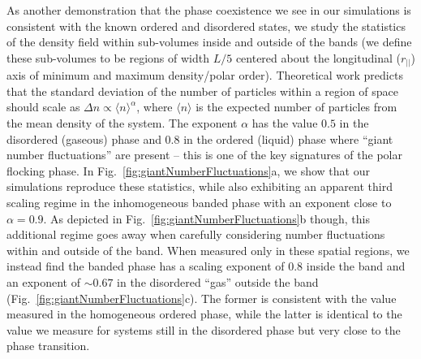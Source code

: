 \documentclass[twoside,twocolumn,9pt]{article}
\begin{document}
As another demonstration that the phase coexistence we see in our simulations is consistent with the known ordered and disordered states, we study the statistics of the density field within sub-volumes inside and outside of the bands (we define these sub-volumes to be regions of width $L/5$ centered about the longitudinal ($r_{||}$) axis of minimum and maximum density/polar order).
Theoretical work predicts that the standard deviation of the number of particles within a region of space should scale as $\Delta{n}\propto\langle{n}\rangle^{\alpha}$, where $\langle{n}\rangle$ is the expected number of particles from the mean density of the system. 
The exponent $\alpha$ has the value $0.5$ in the disordered (gaseous) phase and $0.8$ in the ordered (liquid) phase where ``giant number fluctuations'' are present \cite{toner2005hydrodynamics} -- this is one of the key signatures of the polar flocking phase.
In Fig.~\ref{fig:giantNumberFluctuations}a, we show that our simulations reproduce these statistics, while also exhibiting an apparent third scaling regime in the inhomogeneous banded phase with an exponent close to $\alpha=0.9$.
As depicted in Fig.~\ref{fig:giantNumberFluctuations}b though, this additional regime goes away when carefully considering number fluctuations within and outside of the band.
When measured only in these spatial regions, we instead find the banded phase has a scaling exponent of $0.8$ inside the band and an exponent of $\sim0.67$ in the disordered ``gas'' outside the band (Fig.~\ref{fig:giantNumberFluctuations}c).
The former is consistent with the value measured in the homogeneous ordered phase, while the latter is identical to the value we measure for systems still in the disordered phase but very close to the phase transition.
\end{document}
